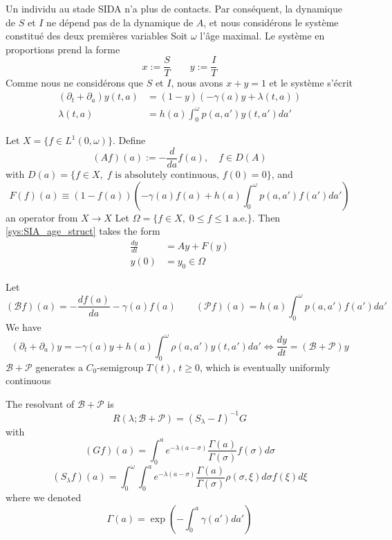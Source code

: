 \documentclass[aspectratio=169]{beamer}\usepackage[]{graphicx}\usepackage[]{xcolor}
\begin{document}
\begin{frame}
Un individu au stade SIDA n'a plus de contacts. Par conséquent, la dynamique de $S$ et $I$ ne dépend pas de la dynamique de $A$, et nous considérons le système constitué des deux premières variables
\vfill
Soit $\omega$ l'âge maximal. Le système en proportions prend la forme
\[
x:=\frac ST\quad\quad y:=\frac IT
\]
\vfill
Comme nous ne considérons que $S$ et $I$, nous avons $x+y=1$ et le système s'écrit
\begin{subequations}\label{sys:SIA_age_struct}
\begin{align}
(\partial_t+\partial_a)y(t,a)&=(1-y)(-\gamma(a)y+\lambda(t,a)) \\
\lambda(t,a)&=h(a)\int_0^\omega p(a,a')y(t,a')da'
\end{align}
\end{subequations}
\end{frame}



\begin{frame}
Let $X=\{f\in L^1(0,\omega)\}$. Define
\[
(Af)(a):=-\frac{d}{da}f(a),\quad f\in D(A)
\]
with $D(a)=\{f\in X,\; f\text{ is absolutely continuous, }f(0)=0\}$,
and
\[
F(f)(a)\equiv (1-f(a))\left(
-\gamma(a)f(a)+h(a)\int_0^\omega p(a,a')f(a')da'\right)
\]
an operator from $X\to X$
\vfill
Let $\Omega=\{f\in X,\; 0\leq f\leq 1\textrm{ a.e.}\}$. Then
\eqref{sys:SIA_age_struct} takes the form
\begin{align*}
\frac{dy}{dt}&= Ay+F(y) \\
y(0)&= y_0\in\Omega
\end{align*}
\end{frame}



\begin{frame}
Let
\[
(\mathcal{B}f)(a)=-\frac{df(a)}{da}-\gamma(a)f(a)
\quad\quad
(\mathcal{P}f)(a)=h(a)\int_0^\omega p(a,a')f(a')da'
\]
\vfill
We have
\[
(\partial_t+\partial_a)y=-\gamma(a)y+h(a)\int_0^\omega
\rho(a,a')y(t,a')da' \Leftrightarrow
\frac{dy}{dt}=(\mathcal{B}+\mathcal{P})y
\]
\vfill
$\mathcal{B}+\mathcal{P}$ generates a $C_0$-semigroup $T(t)$,
$t\geq 0$, which is eventually uniformly continuous
\end{frame}


\begin{frame}
The  resolvant of $\mathcal{B}+\mathcal{P}$ is
\[
R(\lambda;\mathcal{B}+\mathcal{P})=(S_\lambda-I)^{-1}G
\]
with
\[
(Gf)(a)=\int_0^a
e^{-\lambda(a-\sigma)}\frac{\Gamma(a)}{\Gamma(\sigma)}
f(\sigma)d\sigma
\]
\[
(S_\lambda f)(a)=\int_0^\omega\int_0^a
e^{-\lambda(a-\sigma)}\frac{\Gamma(a)}{\Gamma(\sigma)}
\rho(\sigma,\xi)d\sigma f(\xi)d\xi
\]
where we denoted
\[
\Gamma(a)=\exp\left(-\int_0^a \gamma(a')da'\right)
\]
\end{frame}
\end{document}
